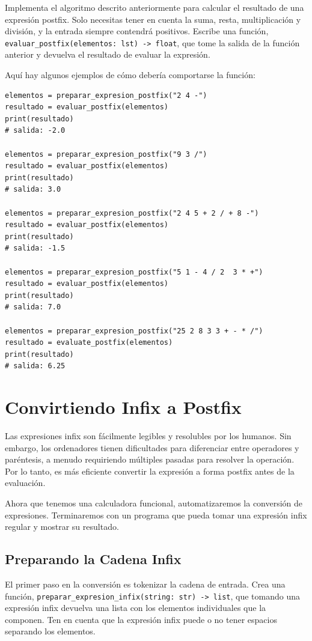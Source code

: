 \documentclass[10pt,a4paper]{article}
\begin{document}
Implementa el algoritmo descrito anteriormente para calcular el resultado de una expresión postfix. Solo necesitas tener en cuenta la suma, resta, multiplicación y división, y la entrada siempre contendrá positivos. Escribe una función, \lstinline|evaluar_postfix(elementos: lst) -> float|, que tome la salida de la función anterior y devuelva el resultado de evaluar la expresión.


Aquí hay algunos ejemplos de cómo debería comportarse la función:

\begin{lstlisting}
elementos = preparar_expresion_postfix("2 4 -")
resultado = evaluar_postfix(elementos)
print(resultado)
# salida: -2.0

elementos = preparar_expresion_postfix("9 3 /")
resultado = evaluar_postfix(elementos)
print(resultado)
# salida: 3.0

elementos = preparar_expresion_postfix("2 4 5 + 2 / + 8 -")
resultado = evaluar_postfix(elementos)
print(resultado)
# salida: -1.5

elementos = preparar_expresion_postfix("5 1 - 4 / 2  3 * +")
resultado = evaluar_postfix(elementos)
print(resultado)
# salida: 7.0

elementos = preparar_expresion_postfix("25 2 8 3 3 + - * /")
resultado = evaluate_postfix(elementos)
print(resultado)
# salida: 6.25
\end{lstlisting}

\newpage

\section{Convirtiendo Infix a Postfix}

Las expresiones infix son fácilmente legibles y resolubles por los humanos. Sin embargo, los ordenadores tienen dificultades para diferenciar entre operadores y paréntesis, a menudo requiriendo múltiples pasadas para resolver la operación. Por lo tanto, es más eficiente convertir la expresión a forma postfix antes de la evaluación.

Ahora que tenemos una calculadora funcional, automatizaremos la conversión de expresiones. Terminaremos con un programa que pueda tomar una expresión infix regular y mostrar su resultado.

\subsection{Preparando la Cadena Infix}
El primer paso en la conversión es tokenizar la cadena de entrada. Crea una función, \lstinline|preparar_expresion_infix(string: str) -> list|, que tomando una expresión infix devuelva una lista con los elementos individuales que la componen. Ten en cuenta que la expresión infix puede o no tener espacios separando los elementos.
\end{document}
